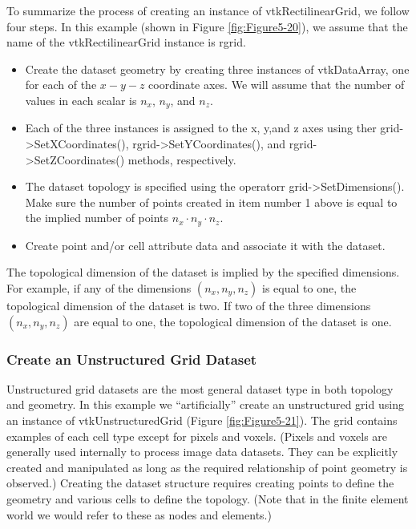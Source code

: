 To summarize the process of creating an instance of vtkRectilinearGrid, we follow four steps. In this example (shown in Figure \ref{fig:Figure5-20}), we assume that the name of the vtkRectilinearGrid instance is rgrid.

\begin{itemize}

	\item Create the dataset geometry by creating three instances of vtkDataArray, one for each of the $x-y-z$ coordinate axes. We will assume that the number of values in each scalar is $n_x$, $n_y$, and $n_z$.

	\item Each of the three instances is assigned to the x, y,and z axes using ther grid->SetXCoordinates(), rgrid->SetYCoordinates(), and rgrid->SetZCoordinates() methods, respectively.

	\item The dataset topology is specified using the operatorr grid->SetDimensions(). Make sure the number of points created in item number 1 above is equal to the implied number of points $n_x⋅n_y⋅n_z$.

	\item Create point and/or cell attribute data and associate it with the dataset.

\end{itemize}

The topological dimension of the dataset is implied by the specified dimensions. For example, if any of the dimensions $(n_x, n_y, n_z)$ is equal to one, the topological dimension of the dataset is two. If two of the three dimensions $(n_x, n_y, n_z)$ are equal to one, the topological dimension of the dataset is one.

\subsubsection{Create an Unstructured Grid Dataset}

Unstructured grid datasets are the most general dataset type in both topology and geometry. In this example we ``artificially'' create an unstructured grid using an instance of vtkUnstructuredGrid (Figure \ref{fig:Figure5-21}). The grid contains examples of each cell type except for pixels and voxels. (Pixels and voxels are generally used internally to process image data datasets. They can be explicitly created and manipulated as long as the required relationship of point geometry is observed.) Creating the dataset structure requires creating points to define the geometry and various cells to define the topology. (Note that in the finite element world we would refer to these as nodes and elements.)

